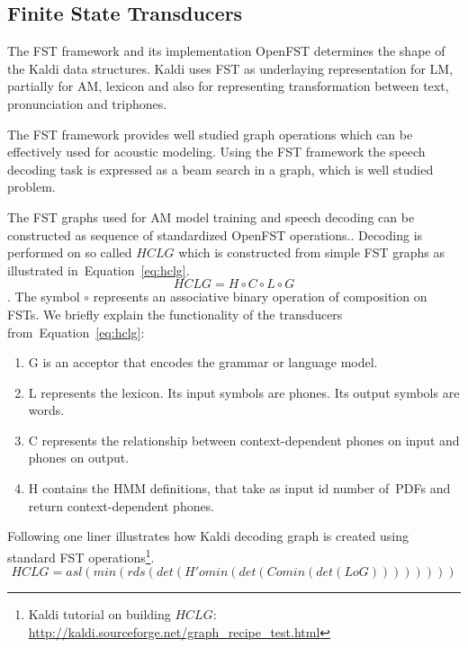 \subsection{Finite State Transducers} 
\label{sec:fst}
The \acl{FST} framework and its implementation OpenFST determines the shape of the Kaldi data structures.
Kaldi uses \ac{FST} as underlaying representation for \ac{LM}, partially for \ac{AM}, lexicon and also for representing transformation between text, pronunciation and triphones.

The \ac{FST} framework provides well studied graph operations\cite{mohri2002weighted} which can be effectively used for acoustic modeling.
Using the \ac{FST} framework the speech decoding task is expressed as a beam search in a graph, which is well studied problem.

The \ac{FST} graphs used for \ac{AM} model training and speech decoding can be constructed as sequence of standardized OpenFST operations.\cite{mohri2002weighted}.
Decoding is performed on so called  $HCLG$ which is constructed from simple \ac{FST} graphs as illustrated in~Equation~\ref{eq:hclg}. 
\begin{equation} \label{eq:hclg}
HCLG = H\circ C\circ L\circ G
\end{equation}.
The symbol $\circ$ represents an associative binary operation of composition on \acp{FST}.
We briefly explain the functionality of the transducers from~Equation~\ref{eq:hclg}:
\begin{enumerate}
    \item G is an acceptor that encodes the grammar or language model.
    \item L represents the lexicon. Its input symbols are phones. Its output symbols are words.
    \item C represents the relationship between context-dependent phones on input and phones on output.
    \item H contains the \ac{HMM} definitions, that take as input id number of~\acp{PDF} and return context-dependent phones.
\end{enumerate}

Following one liner illustrates how Kaldi decoding graph is created using standard \ac{FST} operations\footnote{Kaldi tutorial on building $HCLG$: \url{http://kaldi.sourceforge.net/graph_recipe_test.html}}.\cite{mohri2002weighted}
\begin{equation}
   HCLG = asl(min(rds(det(H' o min(det(C o min(det(L o G)))))))) 
\end{equation}

